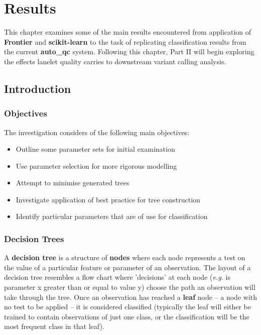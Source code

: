 \chapter{Results}
\ifpdf
    \graphicspath{{Chapter4/Figs/Raster/}{Chapter4/Figs/PDF/}{Chapter4/Figs/}}
\else
    \graphicspath{{Chapter4/Figs/Vector/}{Chapter4/Figs/}}
\fi

This chapter examines some of the main results encountered from application of
\textbf{Frontier} and \textbf{scikit-learn} to the task of replicating
classification results from the current \textbf{auto\_qc} system.
Following this chapter, Part II will begin exploring the effects lanelet quality
carries to downstream variant calling analysis.

\section{Introduction}
\subsection{Objectives}

The investigation considers of the following main objectives:

\begin{itemize}
    \item Outline some parameter sets for initial examination
    \item Use parameter selection for more rigorous modelling
    \item Attempt to minimise generated trees
    \item Investigate application of best practice for tree construction
    \item Identify particular parameters that are of use for classification
\end{itemize}

\subsection{Decision Trees}

A \textbf{decision tree} is a structure of \textbf{nodes} where each node
represents a test on the value of a particular feature or parameter of an
observation. The layout of a decision tree resembles a flow chart where
'decisions' at each node (\textit{e.g.} is parameter x greater than or equal to
value y) choose the path an observation will take through the tree. Once an
observation has reached a \textbf{leaf} node -- a node with no test to be
applied -- it is considered classified (typically the leaf will either be
trained to contain observations of just one class, or the classification will be
the most frequent class in that leaf).

